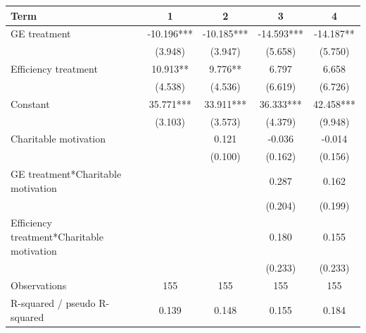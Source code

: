 \begin{tabular}{lcccc}
\hline
Term & 1 & 2 & 3 & 4 \\
\hline
GE treatment & -10.196*** & -10.185*** & -14.593*** & -14.187** \\
 & (3.948) & (3.947) & (5.658) & (5.750) \\
Efficiency treatment & 10.913** & 9.776** & 6.797 & 6.658 \\
 & (4.538) & (4.536) & (6.619) & (6.726) \\
Constant & 35.771*** & 33.911*** & 36.333*** & 42.458*** \\
 & (3.103) & (3.573) & (4.379) & (9.948) \\
Charitable motivation &  & 0.121 & -0.036 & -0.014 \\
 &  & (0.100) & (0.162) & (0.156) \\
GE treatment*Charitable motivation &  &  & 0.287 & 0.162 \\
 &  &  & (0.204) & (0.199) \\
Efficiency treatment*Charitable motivation &  &  & 0.180 & 0.155 \\
 &  &  & (0.233) & (0.233) \\
Observations & 155 & 155 & 155 & 155 \\
R-squared / pseudo R-squared & 0.139 & 0.148 & 0.155 & 0.184 \\
\hline
\end{tabular}
